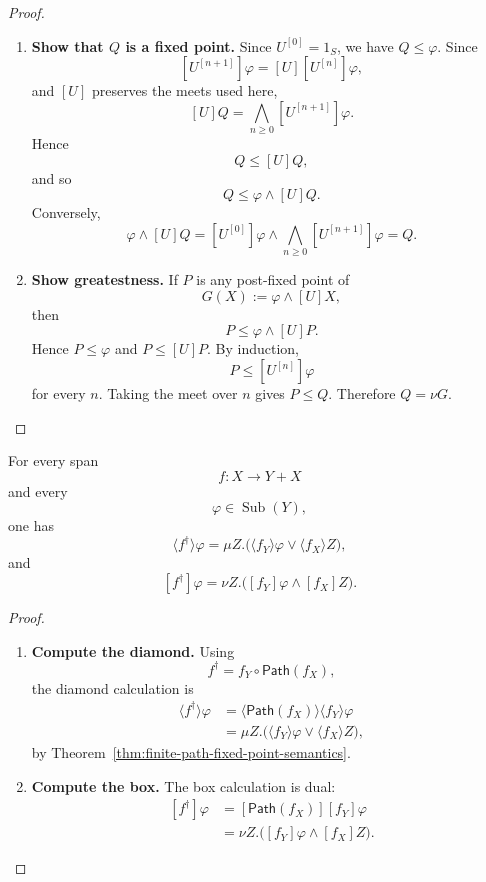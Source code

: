 \begin{proof}
\begin{enumerate}
  \item \textbf{Show that \(Q\) is a fixed point.}
  Since \(U^{[0]}=1_S\), we have \(Q\leq\varphi\). Since
  \[
    [U^{[n+1]}]\varphi
    =
    [U][U^{[n]}]\varphi,
  \]
  and \([U]\) preserves the meets used here,
  \[
    [U]Q
    =
    \bigwedge_{n\geq 0}[U^{[n+1]}]\varphi.
  \]
  Hence
  \[
    Q\leq[U]Q,
  \]
  and so
  \[
    Q\leq\varphi\wedge[U]Q.
  \]
  Conversely,
  \[
    \varphi\wedge[U]Q
    =
    [U^{[0]}]\varphi
    \wedge
    \bigwedge_{n\geq 0}[U^{[n+1]}]\varphi
    =
    Q.
  \]

  \item \textbf{Show greatestness.}
  If \(P\) is any post-fixed point of
  \[
    G(X):=\varphi\wedge[U]X,
  \]
  then
  \[
    P\leq\varphi\wedge[U]P.
  \]
  Hence \(P\leq\varphi\) and \(P\leq[U]P\). By induction,
  \[
    P\leq[U^{[n]}]\varphi
  \]
  for every \(n\). Taking the meet over \(n\) gives \(P\leq Q\). Therefore
  \(Q=\nu G\).
\end{enumerate}
\end{proof}

\begin{theorem}
\label{thm:modal-semantics-dagger-feedback}
For every span
\[
  f:X\to Y+X
\]
and every
\[
  \varphi\in\operatorname{Sub}(Y),
\]
one has
\[
  \langle f^\dagger\rangle\varphi
  =
  \mu Z.
  \bigl(
    \langle f_Y\rangle\varphi
    \vee
    \langle f_X\rangle Z
  \bigr),
\]
and
\[
  [f^\dagger]\varphi
  =
  \nu Z.
  \bigl(
    [f_Y]\varphi
    \wedge
    [f_X]Z
  \bigr).
\]
\end{theorem}

\begin{proof}
\begin{enumerate}
  \item \textbf{Compute the diamond.}
  Using
  \[
    f^\dagger=f_Y\circ\mathsf{Path}(f_X),
  \]
  the diamond calculation is
  \[
  \begin{aligned}
    \langle f^\dagger\rangle\varphi
    &=
    \langle\mathsf{Path}(f_X)\rangle
    \langle f_Y\rangle\varphi
    \\
    &=
    \mu Z.
    \bigl(
      \langle f_Y\rangle\varphi
      \vee
      \langle f_X\rangle Z
    \bigr),
  \end{aligned}
  \]
  by Theorem~\ref{thm:finite-path-fixed-point-semantics}.

  \item \textbf{Compute the box.}
  The box calculation is dual:
  \[
  \begin{aligned}
    [f^\dagger]\varphi
    &=
    [\mathsf{Path}(f_X)]
    [f_Y]\varphi
    \\
    &=
    \nu Z.
    \bigl(
      [f_Y]\varphi
      \wedge
      [f_X]Z
    \bigr).
  \end{aligned}
  \]
\end{enumerate}
\end{proof}


